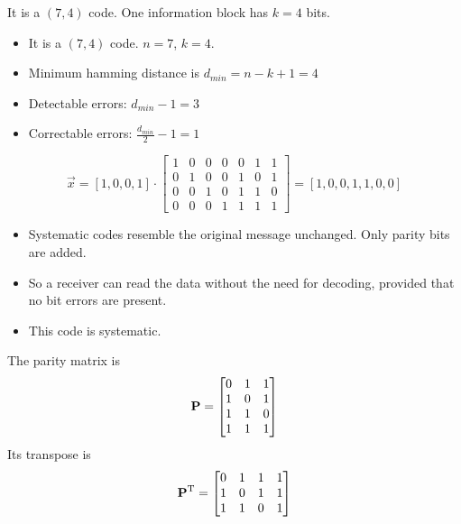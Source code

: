 \begin{solution}
	\begin{tasks}
		\task
		It is a $(7,4)$ code. One information block has $k = 4$ bits.
		
		\task
		\begin{itemize}
			\item It is a $(7,4)$ code. $n = 7$, $k = 4$.
			\item Minimum hamming distance is $d_{min} = n - k + 1 = 4$
			\item Detectable errors: $d_{min} - 1 = 3$
			\item Correctable errors: $\frac{d_{min}}{2} - 1 = 1$
		\end{itemize}
		
		\task
		\begin{equation*}
			\vec{x} = \left[1, 0, 0, 1\right] \cdot \left[\begin{matrix}
				1 & 0 & 0 & 0 & 0 & 1 & 1 \\
				0 & 1 & 0 & 0 & 1 & 0 & 1 \\
				0 & 0 & 1 & 0 & 1 & 1 & 0 \\
				0 & 0 & 0 & 1 & 1 & 1 & 1
			\end{matrix}\right] = \left[1, 0, 0, 1, 1, 0, 0\right]
		\end{equation*}
		
		\task
		\begin{itemize}
			\item Systematic codes resemble the original message unchanged. Only parity bits are added.
			\item So a receiver can read the data without the need for decoding, provided that no bit errors are present.
			\item This code is systematic.
		\end{itemize}
	
		\task
		The parity matrix is
		\begin{equation*}
			\bm{\mathrm{P}} = \left[\begin{matrix}
				0 & 1 & 1 \\
				1 & 0 & 1 \\
				1 & 1 & 0 \\
				1 & 1 & 1
			\end{matrix}\right]
		\end{equation*}
		Its transpose is
		\begin{equation*}
			\bm{\mathrm{P}}^{\mathrm{T}} = \left[\begin{matrix}
				0 & 1 & 1 & 1 \\
				1 & 0 & 1 & 1 \\
				1 & 1 & 0 & 1
			\end{matrix}\right]
		\end{equation*}
	

\end{tasks}
\end{solution}
